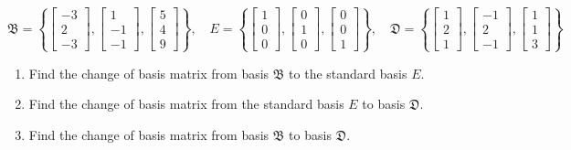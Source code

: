 \documentclass[10pt]{article}
\begin{document}
$$
\mathfrak{B}=\left\{\left[\begin{array}{c}
-3 \\
2 \\
-3
\end{array}\right],\left[\begin{array}{c}
1 \\
-1 \\
-1
\end{array}\right],\left[\begin{array}{l}
5 \\
4 \\
9
\end{array}\right]\right\}, \quad E=\left\{\left[\begin{array}{l}
1 \\
0 \\
0
\end{array}\right],\left[\begin{array}{l}
0 \\
1 \\
0
\end{array}\right],\left[\begin{array}{l}
0 \\
0 \\
1
\end{array}\right]\right\}, \quad \mathfrak{D}=\left\{\left[\begin{array}{l}
1 \\
2 \\
1
\end{array}\right],\left[\begin{array}{c}
-1 \\
2 \\
-1
\end{array}\right],\left[\begin{array}{l}
1 \\
1 \\
3
\end{array}\right]\right\}
$$

\begin{enumerate}
  \item Find the change of basis matrix from basis $\mathfrak{B}$ to the standard basis $E$.
  \item Find the change of basis matrix from the standard basis $E$ to basis $\mathfrak{D}$.
  \item Find the change of basis matrix from basis $\mathfrak{B}$ to basis $\mathfrak{D}$.
\end{enumerate}
\end{document}
